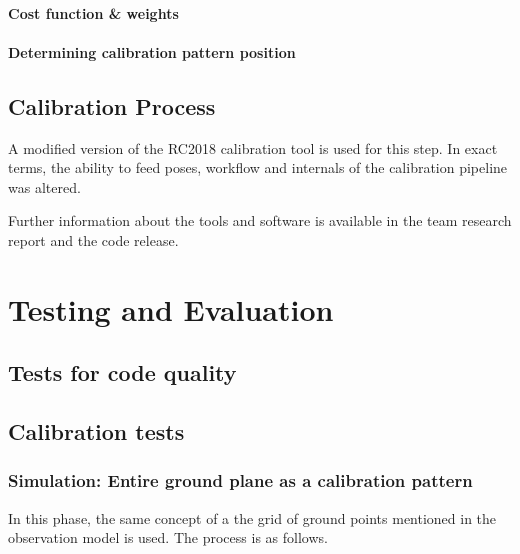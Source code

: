 \documentclass[english, printversion, nomenclature, notitle]{tuvisionthesis} %
\begin{document}
\subsubsection{Cost function \& weights}


\subsubsection{Determining calibration pattern position}

\section{Calibration Process}
A modified version of the RC2018 calibration tool is used for this step. In exact terms, the ability to feed poses, workflow and internals of the calibration pipeline was altered.

Further information about the tools and software is available in the team research report and the code release. 

\chapter{Testing and Evaluation}
\section{Tests for code quality}
\section{Calibration tests}
\subsection{Simulation: Entire ground plane as a calibration pattern}

In this phase, the same concept of a the grid of ground points mentioned in the observation model is used. The process is as follows.
\end{document}
